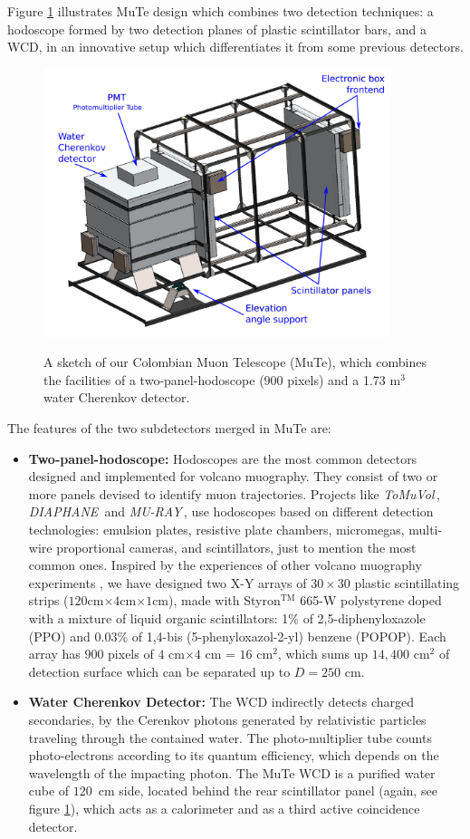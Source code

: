 \documentclass[letterpaper,10pt,titlepage,linenumber]{article}
\begin{document}
Figure \ref{MuTeTelescope} illustrates MuTe design which combines two detection techniques: a hodoscope formed by two detection planes of plastic scintillator bars, and a WCD, in an innovative setup which differentiates it from some previous detectors. 
\begin{figure}
\centering
{\includegraphics[width=4in]{Figures/TelescopioMuTe2.png}}
\caption{A sketch of our Colombian Muon Telescope (MuTe), which combines the facilities of a two-panel-hodoscope ($900$ pixels) and a 1.73 m$^3$ water Cherenkov detector. }
\label{MuTeTelescope}
\end{figure}

The features of the two subdetectors merged in MuTe are:
\begin{itemize}
    \item \textbf{Two-panel-hodoscope:} Hodoscopes are the most common detectors designed and implemented for volcano muography. They consist of two or more panels devised to identify muon trajectories. Projects like  \textsl{ToMuVol}\,\cite{CarloganuEtal2013},  \textsl{DIAPHANE}\,\cite{LesparreEtal2010} and \textsl{MU-RAY}\,\cite{AnastasioEtal2013}, use hodoscopes based on different detection technologies: emulsion plates, resistive plate chambers, micromegas, multi-wire proportional cameras, and scintillators, just to mention the most common ones. Inspired by the experiences of other volcano muography experiments \cite{UchidaTanakaTanaka2009,GibertEtal2010}, we have designed two X-Y  arrays of $30 \times 30$ plastic scintillating strips ($120$cm$\times 4$cm$\times 1$cm), made with Styron$^{\textrm{TM}}$ 665-W polystyrene doped with a mixture of liquid organic scintillators: 1\% of 2,5-diphenyloxazole (PPO) and 0.03\% of 1,4-bis (5-phenyloxazol-2-yl) benzene (POPOP). Each array has $900$ pixels of $4$ cm$\times 4$ cm = $16$ cm$^2$, which sums up $14,400$ cm$^2$ of detection surface which can be separated up to $D=250$ cm.
    \item \textbf{Water Cherenkov Detector:} The WCD indirectly detects charged secondaries, by the Cerenkov photons generated by relativistic particles traveling through the contained water. The photo-multiplier tube counts photo-electrons according to its quantum efficiency, which depends on the wavelength of the impacting photon.  The MuTe WCD is a purified water cube of $120$\, cm side, located behind the rear scintillator panel (again, see figure \ref{MuTeTelescope}), which acts as a calorimeter and as a third active coincidence detector. 
\end{itemize}
\end{document}
